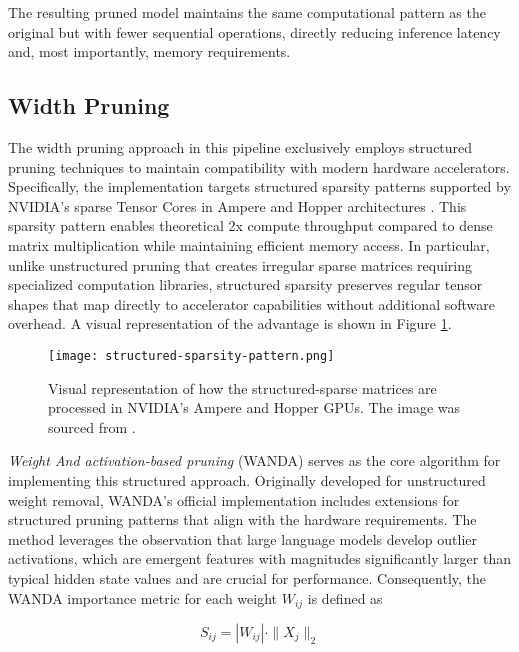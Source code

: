 The resulting pruned model maintains the same computational pattern as the original but with fewer sequential operations, directly reducing inference latency and, most importantly, memory requirements.

\subsection{Width Pruning} \label{wanda}

The width pruning approach in this pipeline exclusively employs structured pruning techniques to maintain compatibility with modern hardware accelerators. Specifically, the implementation targets structured sparsity patterns supported by NVIDIA's sparse Tensor Cores in Ampere and Hopper architectures \cite{nvidia-width}. This sparsity pattern enables theoretical 2x compute throughput compared to dense matrix multiplication while maintaining efficient memory access. In particular, unlike unstructured pruning that creates irregular sparse matrices requiring specialized computation libraries, structured sparsity preserves regular tensor shapes that map directly to accelerator capabilities without additional software overhead. A visual representation of the advantage is shown in Figure \ref{fig:nvidia-width}.

\begin{figure}[htbp]
    \centering
    \texttt{[image: structured-sparsity-pattern.png]}
    \caption[Advantages of Structured Sparsity]{Visual representation of how the structured-sparse matrices are processed in NVIDIA's Ampere and Hopper GPUs. The image was sourced from \cite{nvidia-width}.}
    \label{fig:nvidia-width}
\end{figure}

\textit{Weight And activation-based pruning} (WANDA) \cite{wanda} serves as the core algorithm for implementing this structured approach. Originally developed for unstructured weight removal, WANDA's official implementation includes extensions for structured pruning patterns that align with the hardware requirements. The method leverages the observation that large language models develop outlier activations, which are emergent features with magnitudes significantly larger than typical hidden state values and are crucial for performance. Consequently, the WANDA importance metric for each weight $W_{ij}$ is defined as

\begin{equation}
S_{ij} = |W_{ij}| \cdot \|X_j\|_2
\end{equation}

